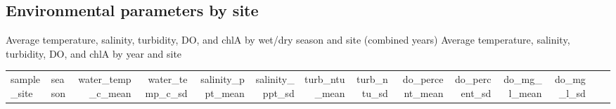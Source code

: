 \documentclass[
]{article}
\begin{document}
\hypertarget{environmental-parameters-by-site}{%
\subsection{Environmental parameters by
site}\label{environmental-parameters-by-site}}

Average temperature, salinity, turbidity, DO, and chlA by wet/dry season
and site (combined years) Average temperature, salinity, turbidity, DO,
and chlA by year and site

\begin{longtable}[]{@{}llrrrrrrrrrrrr@{}}
\toprule
\begin{minipage}[b]{0.11\columnwidth}\raggedright
sample\_site\strut
\end{minipage} & \begin{minipage}[b]{0.02\columnwidth}\raggedright
season\strut
\end{minipage} & \begin{minipage}[b]{0.05\columnwidth}\raggedleft
water\_temp\_c\_mean\strut
\end{minipage} & \begin{minipage}[b]{0.05\columnwidth}\raggedleft
water\_temp\_c\_sd\strut
\end{minipage} & \begin{minipage}[b]{0.05\columnwidth}\raggedleft
salinity\_ppt\_mean\strut
\end{minipage} & \begin{minipage}[b]{0.05\columnwidth}\raggedleft
salinity\_ppt\_sd\strut
\end{minipage} & \begin{minipage}[b]{0.04\columnwidth}\raggedleft
turb\_ntu\_mean\strut
\end{minipage} & \begin{minipage}[b]{0.04\columnwidth}\raggedleft
turb\_ntu\_sd\strut
\end{minipage} & \begin{minipage}[b]{0.05\columnwidth}\raggedleft
do\_percent\_mean\strut
\end{minipage} & \begin{minipage}[b]{0.04\columnwidth}\raggedleft
do\_percent\_sd\strut
\end{minipage} & \begin{minipage}[b]{0.04\columnwidth}\raggedleft
do\_mg\_l\_mean\strut
\end{minipage} & \begin{minipage}[b]{0.03\columnwidth}\raggedleft
do\_mg\_l\_sd\strut

\end{minipage}
\end{longtable}
\end{document}
